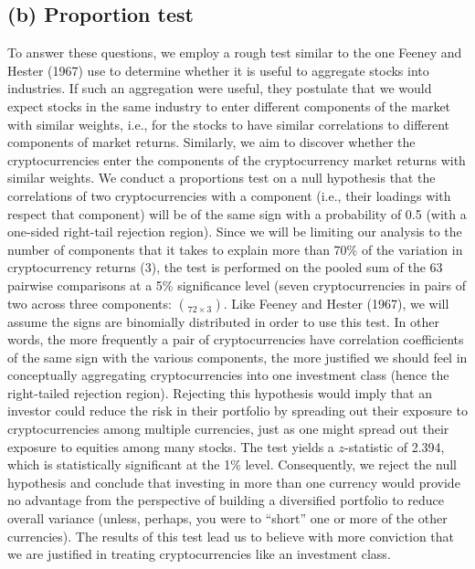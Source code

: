 \documentclass[12pt,twoside]{article}
\begin{document}
\subsection*{(b) Proportion test}
To answer these questions, we employ a rough test similar to the one Feeney and Hester (1967) use to determine whether it is useful to aggregate stocks into industries. If such an aggregation were useful, they postulate that we would expect stocks in the same industry to enter different components of the market with similar weights, i.e., for the stocks to have similar correlations to different components of market returns. Similarly, we aim to discover whether the cryptocurrencies enter the components of the cryptocurrency market returns with similar weights. We conduct a proportions test on a null hypothesis that the correlations of two cryptocurrencies with a component (i.e., their loadings with respect that component) will be of the same sign with a probability of 0.5 (with a one-sided right-tail rejection region). Since we will be limiting our analysis to the number of components that it takes to explain more than 70\% of the variation in cryptocurrency returns (3), the test is performed on the pooled sum of the 63 pairwise comparisons at a 5\% significance level (seven cryptocurrencies in pairs of two across three components: $\choose{7}{2} \times 3$. Like Feeney and Hester (1967), we will assume the signs are binomially distributed in order to use this test.
\bigbreak
In other words, the more frequently a pair of cryptocurrencies have correlation coefficients of the same sign with the various components, the more justified we should feel in conceptually aggregating cryptocurrencies into one investment class (hence the right-tailed rejection region). Rejecting this hypothesis would imply that an investor could reduce the risk in their portfolio by spreading out their exposure to cryptocurrencies among multiple currencies, just as one might spread out their exposure to equities among many stocks. The test yields a $z$-statistic of 2.394, which is statistically significant at the 1\% level. Consequently, we reject the null hypothesis and conclude that investing in more than one currency would provide no advantage from the perspective of building a diversified portfolio to reduce overall variance (unless, perhaps, you were to “short” one or more of the other currencies). The results of this test lead us to believe with more conviction that we are justified in treating cryptocurrencies like an investment class.
\bigbreak
\end{document}
